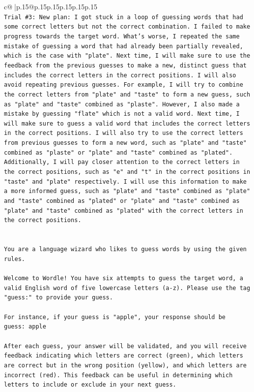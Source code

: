 \documentclass{article}
\begin{document}
{\begin{supertabular}{c@{$\;$}|p{.15\linewidth}@{}p{.15\linewidth}p{.15\linewidth}p{.15\linewidth}p{.15\linewidth}p{.15\linewidth}}
{{{\\ 
\texttt{Trial \#3: New plan: I got stuck in a loop of guessing words that had some correct letters but not the correct combination. I failed to make progress towards the target word. What's worse, I repeated the same mistake of guessing a word that had already been partially revealed, which is the case with "plate". Next time, I will make sure to use the feedback from the previous guesses to make a new, distinct guess that includes the correct letters in the correct positions. I will also avoid repeating previous guesses. For example, I will try to combine the correct letters from "plate" and "taste" to form a new guess, such as "plate" and "taste" combined as "plaste". However, I also made a mistake by guessing "flate" which is not a valid word. Next time, I will make sure to guess a valid word that includes the correct letters in the correct positions. I will also try to use the correct letters from previous guesses to form a new word, such as "plate" and "taste" combined as "plaste" or "plate" and "taste" combined as "plated". Additionally, I will pay closer attention to the correct letters in the correct positions, such as "e" and "t" in the correct positions in "taste" and "plate" respectively. I will use this information to make a more informed guess, such as "plate" and "taste" combined as "plate" and "taste" combined as "plated" or "plate" and "taste" combined as "plate" and "taste" combined as "plated" with the correct letters in the correct positions.} \\
\\ 
\\ 
\texttt{You are a language wizard who likes to guess words by using the given rules.} \\
\\ 
\texttt{Welcome to Wordle! You have six attempts to guess the target word, a valid English word of five lowercase letters (a{-}z). Please use the tag "guess:" to provide your guess.} \\
\\ 
\texttt{For instance, if your guess is "apple", your response should be} \\
\texttt{guess: apple} \\
\\ 
\texttt{After each guess, your answer will be validated, and you will receive feedback indicating which letters are correct (green), which letters are correct but in the wrong position (yellow), and which letters are incorrect (red). This feedback can be useful in determining which letters to include or exclude in your next guess.} \\
}}}
\end{supertabular}}
\end{document}
